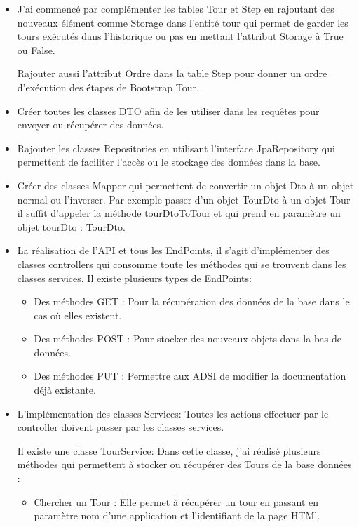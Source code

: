 \documentclass[12pt]{article}
\begin{document}
\begin{itemize}

\item J'ai commencé par complémenter les tables Tour et Step en rajoutant des nouveaux élément comme Storage dans l'entité tour qui permet de garder les tours exécutés dans l'historique ou pas en mettant l’attribut Storage à True ou False. 

Rajouter aussi l'attribut Ordre dans la table Step pour donner un ordre d’exécution des étapes de Bootstrap Tour. 
  
  

\item Créer toutes les classes DTO afin de les utiliser dans les requêtes  pour envoyer ou récupérer des données.

\item Rajouter les classes Repositories en utilisant l'interface JpaRepository qui permettent de faciliter l'accès ou le stockage des données dans la base.

\item Créer des classes Mapper qui permettent de convertir un objet Dto à un objet normal ou l'inverser. Par exemple passer d'un objet TourDto à un objet Tour il suffit d'appeler la méthode tourDtoToTour et qui prend en paramètre un objet tourDto : TourDto.  

\item La réalisation de l'API et tous les EndPoints, il s'agit d’implémenter des classes controllers qui consomme toute les méthodes qui se trouvent dans les classes services. Il existe plusieurs types de EndPoints: 
\begin{itemize}
\item Des méthodes GET : Pour la récupération des données de la base dans le cas où elles existent.

\item Des méthodes POST : Pour stocker des nouveaux objets dans la bas de données.

\item Des méthodes PUT : Permettre aux ADSI de modifier la documentation déjà existante. 

\end{itemize}
\item L'implémentation des classes Services: Toutes les actions effectuer par le controller doivent passer par les classes services. 

Il existe une classe TourService: Dans cette classe, j'ai réalisé plusieurs méthodes qui permettent à stocker ou récupérer des Tours de la base données : 
\begin{itemize}
\item Chercher un Tour : Elle permet à récupérer un tour en passant en paramètre nom d'une application et l'identifiant de la page HTMl. 


\end{itemize}
\end{itemize}
\end{document}
